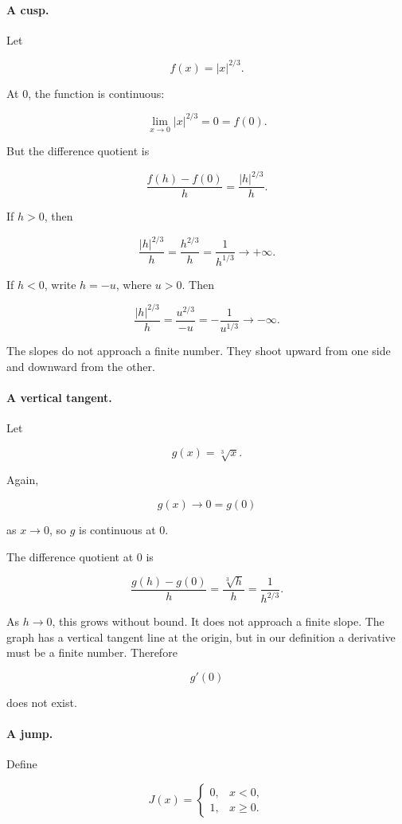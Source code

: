 \paragraph{A cusp.}
Let

\[
f(x)=|x|^{2/3}.
\]

At \(0\), the function is continuous:

\[
\lim_{x\to0}|x|^{2/3}=0=f(0).
\]

But the difference quotient is

\[
\frac{f(h)-f(0)}{h}
=
\frac{|h|^{2/3}}{h}.
\]

If \(h>0\), then

\[
\frac{|h|^{2/3}}{h}
=
\frac{h^{2/3}}{h}
=
\frac{1}{h^{1/3}}
\to+\infty.
\]

If \(h<0\), write \(h=-u\), where \(u>0\).  Then

\[
\frac{|h|^{2/3}}{h}
=
\frac{u^{2/3}}{-u}
=
-\frac{1}{u^{1/3}}
\to-\infty.
\]

The slopes do not approach a finite number.  They shoot upward from one side and downward from the other.

\paragraph{A vertical tangent.}
Let

\[
g(x)=\sqrt[3]{x}.
\]

Again,

\[
g(x)\to0=g(0)
\]

as \(x\to0\), so \(g\) is continuous at \(0\).

The difference quotient at \(0\) is

\[
\frac{g(h)-g(0)}{h}
=
\frac{\sqrt[3]{h}}{h}
=
\frac{1}{h^{2/3}}.
\]

As \(h\to0\), this grows without bound.  It does not approach a finite slope.  The graph has a vertical tangent line at the origin, but in our definition a derivative must be a finite number.  Therefore

\[
g'(0)
\]

does not exist.

\paragraph{A jump.}
Define

\[
J(x)=
\begin{cases}
0, & x<0,\\
1, & x\ge0.
\end{cases}
\]

